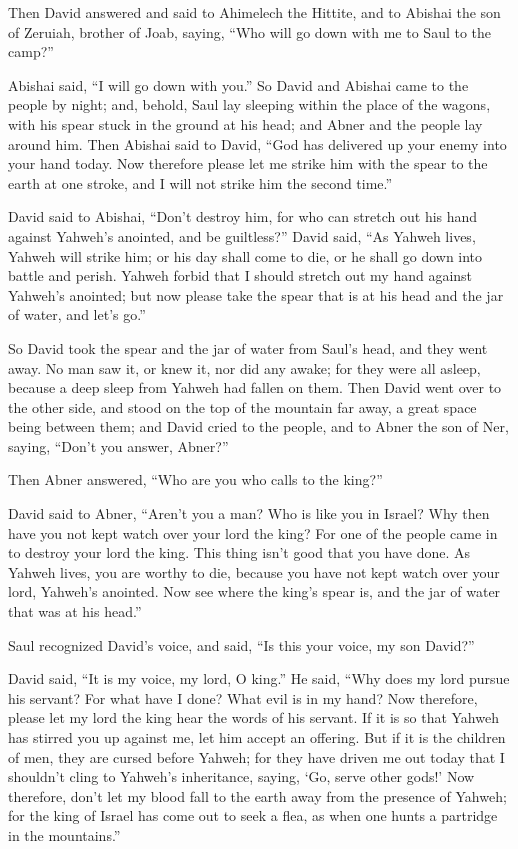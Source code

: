  Then David answered and said to Ahimelech the Hittite, and
to Abishai the son of Zeruiah, brother of Joab, saying, ``Who will go
down with me to Saul to the camp?''

Abishai said, ``I will go down with you.''  So David and
Abishai came to the people by night; and, behold, Saul lay sleeping
within the place of the wagons, with his spear stuck in the ground at
his head; and Abner and the people lay around him.  Then
Abishai said to David, ``God has delivered up your enemy into your hand
today. Now therefore please let me strike him with the spear to the
earth at one stroke, and I will not strike him the second time.''

 David said to Abishai, ``Don't destroy him, for who can
stretch out his hand against Yahweh's anointed, and be guiltless?''
 David said, ``As Yahweh lives, Yahweh will strike him; or
his day shall come to die, or he shall go down into battle and perish.
 Yahweh forbid that I should stretch out my hand against
Yahweh's anointed; but now please take the spear that is at his head and
the jar of water, and let's go.''

 So David took the spear and the jar of water from Saul's
head, and they went away. No man saw it, or knew it, nor did any awake;
for they were all asleep, because a deep sleep from Yahweh had fallen on
them.  Then David went over to the other side, and stood on
the top of the mountain far away, a great space being between them;
 and David cried to the people, and to Abner the son of
Ner, saying, ``Don't you answer, Abner?''

Then Abner answered, ``Who are you who calls to the king?''

 David said to Abner, ``Aren't you a man? Who is like you
in Israel? Why then have you not kept watch over your lord the king? For
one of the people came in to destroy your lord the king. 
This thing isn't good that you have done. As Yahweh lives, you are
worthy to die, because you have not kept watch over your lord, Yahweh's
anointed. Now see where the king's spear is, and the jar of water that
was at his head.''

 Saul recognized David's voice, and said, ``Is this your
voice, my son David?''

David said, ``It is my voice, my lord, O king.''  He said,
``Why does my lord pursue his servant? For what have I done? What evil
is in my hand?  Now therefore, please let my lord the king
hear the words of his servant. If it is so that Yahweh has stirred you
up against me, let him accept an offering. But if it is the children of
men, they are cursed before Yahweh; for they have driven me out today
that I shouldn't cling to Yahweh's inheritance, saying, `Go, serve other
gods!'  Now therefore, don't let my blood fall to the earth
away from the presence of Yahweh; for the king of Israel has come out to
seek a flea, as when one hunts a partridge in the mountains.''

